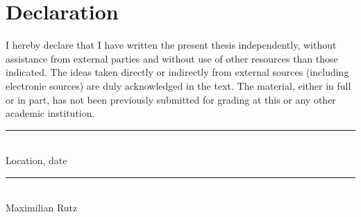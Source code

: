 \section*{Declaration}
I hereby declare that I have written the present thesis
independently, without assistance from external parties and without
use of other resources than those indicated.
The ideas taken directly or indirectly from external sources
(including electronic sources) are duly acknowledged in the text.
The material, either in full or in part, has not been previously
submitted for grading at this or any other academic institution.\\
\parbox{\textwidth}{
    \vspace{3cm}
    \parbox{7cm}{
        \rule{5cm}{0.5pt}\\
        Location, date
    }
    \hfill
    \parbox{7cm}{
        \rule{5cm}{0.5pt}\\
        Maximilian Rutz
    }
}